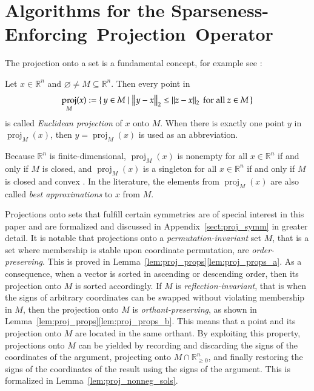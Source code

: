 \documentclass[twoside,11pt]{article}
\DeclareMathOperator{\proj}{proj}
\newcommand{\R}{\mathbb{R}}
\newcommand{\0}{\mathcal{O}}
\newcommand{\norm}[1]{\left\Vert#1\right\Vert}
\renewcommand{\emptyset}{\varnothing}
\begin{document}
\section{Algorithms for the Sparseness-Enforcing~Projection~Operator}
\label{sect:projalgorithms}

The projection onto a set is a fundamental concept, for example see \cite{Deutsch2001}:
\begin{definition}
\label{dfn:projection}
Let $x\in\R^n$ and $\emptyset\neq M\subseteq\R^n$.
Then every point in
\begin{displaymath}
  \proj_M(x) := \set{y\in M | \norm{y - x}_2 \leq \norm{z - x}_2\text{ for all }z\in M}
\end{displaymath}
is called \emph{Euclidean projection} of $x$ onto $M$.
When there is exactly one point $y$ in $\proj_M(x)$, then $y = \proj_M(x)$ is used as an abbreviation.
\end{definition}
Because $\R^n$ is finite-dimensional, $\proj_M(x)$ is nonempty for all $x\in\R^n$ if and only if $M$ is closed, and $\proj_M(x)$ is a singleton for all $x\in\R^n$ if and only if $M$ is closed and convex \citep{Deutsch2001}.
In the literature, the elements from $\proj_M(x)$ are also called \emph{best approximations} to $x$ from $M$.

Projections onto sets that fulfill certain symmetries are of special interest in this paper and are formalized and discussed in Appendix~\ref{sect:proj_symm} in greater detail.
It is notable that projections onto a \emph{permutation-invariant} set $M$, that is a set where membership is stable upon coordinate permutation, are \emph{order-preserving}.
This is proved in Lemma~\ref{lem:proj_props}\ref{lem:proj_props_a}.
As a consequence, when a vector is sorted in ascending or descending order, then its projection onto $M$ is sorted accordingly.
If $M$ is \emph{reflection-invariant}, that is when the signs of arbitrary coordinates can be swapped without violating membership in $M$, then the projection onto $M$ is \emph{orthant-preserving}, as shown in Lemma~\ref{lem:proj_props}\ref{lem:proj_props_b}.
This means that a point and its projection onto $M$ are located in the same orthant.
By exploiting this property, projections onto $M$ can be yielded by recording and discarding the signs of the coordinates of the argument, projecting onto $M\cap\R_{\geq 0}^n$, and finally restoring the signs of the coordinates of the result using the signs of the argument.
This is formalized in Lemma~\ref{lem:proj_nonneg_sols}.
\end{document}

